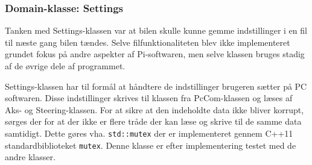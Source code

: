 \subsubsection{Domain-klasse: Settings} \label{sec:settings}
Tanken med Settings-klassen var at bilen skulle kunne gemme indstillinger i en fil til næste gang bilen tændes.
Selve filfunktionaliteten blev ikke implementeret grundet fokus på andre aspekter af Pi-softwaren, men selve klassen bruges stadig af de øvrige dele af programmet.

Settings-klassen har til formål at håndtere de indstillinger brugeren sætter på PC softwaren. 
Disse indstillinger skrives til klassen fra PcCom-klassen og læses af Aks- og Steering-klassen. 
For at sikre at den indeholdte data ikke bliver korrupt, sørges der for at der ikke er flere tråde der kan læse og skrive til de samme data samtidigt. 
Dette gøres vha. \texttt{std::mutex} der er implementeret gennem C++11 standardbiblioteket \texttt{mutex}. 
Denne klasse er efter implementering testet med de andre klasser.